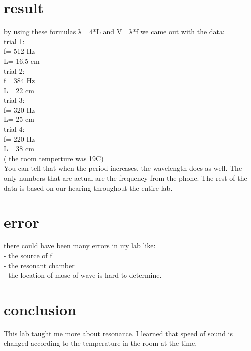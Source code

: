 \documentclass{article}
\begin{document}
\section{result}
by using these formulas λ= 4*L and V= λ*f we came out with the data: \\
trial 1: \\
f= 512 Hz \\
L= 16,5 cm \\
trial 2: \\
f= 384 Hz \\
L= 22 cm \\
trial 3: \\
f= 320 Hz \\
L= 25 cm \\
trial 4: \\
f= 220 Hz \\
L= 38 cm \\
( the room temperture was 19C)\\
You	can	tell	that	when	the	period	increases,	the	wavelength	does	as	well.	The	only	
numbers	that	are	actual	are	the	frequency	from the phone.	The	rest	of	the	data	is	based	on	our	
hearing	throughout	the	entire	lab.	

\section{error}
there could have been many errors in my lab like:\\
- the source of f\\
- the resonant chamber\\
- the location of mose of wave is hard to determine.

\section{conclusion}
This	lab	taught	me	more	about	resonance.	I	learned	that	speed	of	sound	is	changed	
according	to	the	temperature	in	the	room	at	the	time.	
\end{document}
